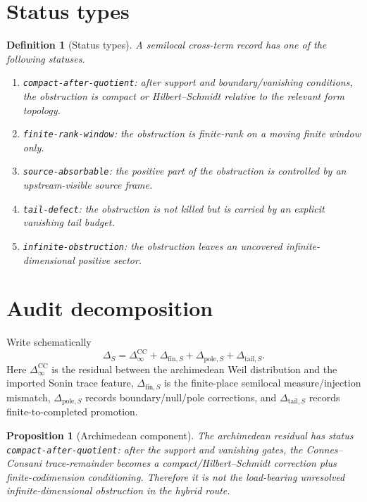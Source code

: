 \documentclass[11pt]{article}
\newtheorem{proposition}{Proposition}
\newtheorem{definition}{Definition}
\begin{document}
\section{Status types}
\begin{definition}[Status types]
A semilocal cross-term record has one of the following statuses.
\begin{enumerate}[label=(\roman*)]
\item \texttt{compact-after-quotient}: after support and boundary/vanishing conditions, the obstruction is compact or Hilbert--Schmidt relative to the relevant form topology.
\item \texttt{finite-rank-window}: the obstruction is finite-rank on a moving finite window only.
\item \texttt{source-absorbable}: the positive part of the obstruction is controlled by an upstream-visible source frame.
\item \texttt{tail-defect}: the obstruction is not killed but is carried by an explicit vanishing tail budget.
\item \texttt{infinite-obstruction}: the obstruction leaves an uncovered infinite-dimensional positive sector.
\end{enumerate}
\end{definition}

\section{Audit decomposition}
Write schematically
\[
  \Delta_S = \Delta_{\infty}^{\mathrm{CC}} + \Delta_{\mathrm{fin},S} + \Delta_{\mathrm{pole},S} + \Delta_{\mathrm{tail},S}.
\]
Here $\Delta_{\infty}^{\mathrm{CC}}$ is the residual between the archimedean Weil distribution and the imported Sonin trace feature, $\Delta_{\mathrm{fin},S}$ is the finite-place semilocal measure/injection mismatch, $\Delta_{\mathrm{pole},S}$ records boundary/null/pole corrections, and $\Delta_{\mathrm{tail},S}$ records finite-to-completed promotion.

\begin{proposition}[Archimedean component]
The archimedean residual has status \texttt{compact-after-quotient}: after the support and vanishing gates, the Connes--Consani trace-remainder becomes a compact/Hilbert--Schmidt correction plus finite-codimension conditioning.  Therefore it is not the load-bearing unresolved infinite-dimensional obstruction in the hybrid route.
\end{proposition}
\end{document}
